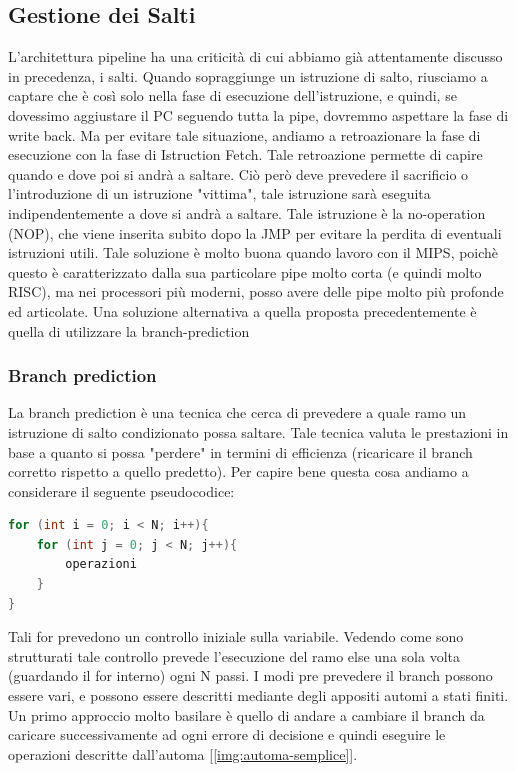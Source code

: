 \subsection{Gestione dei Salti}
L'architettura pipeline ha una criticità di cui abbiamo già attentamente discusso in precedenza, i salti.
Quando sopraggiunge un istruzione di salto, riusciamo a captare che è così solo nella fase di esecuzione dell'istruzione, e quindi, se dovessimo aggiustare il PC seguendo tutta la pipe, dovremmo aspettare la fase di write back. Ma per evitare tale situazione, andiamo a retroazionare la fase di esecuzione con la fase di Istruction Fetch. Tale retroazione permette di capire quando e dove poi si andrà a saltare. Ciò però deve prevedere il sacrificio o l'introduzione di un istruzione "vittima", tale istruzione sarà eseguita indipendentemente a dove si andrà a saltare. Tale istruzione è la no-operation (NOP), che viene inserita subito dopo la JMP per evitare la perdita di eventuali istruzioni utili.
Tale soluzione è molto buona quando lavoro con il MIPS, poichè questo è caratterizzato dalla sua particolare pipe molto corta (e quindi molto RISC), ma nei processori più moderni, posso avere delle pipe molto più profonde ed articolate. Una soluzione alternativa a quella proposta precedentemente è quella di utilizzare la branch-prediction

\subsubsection{Branch prediction}
La branch prediction è una tecnica che cerca di prevedere a quale ramo un istruzione di salto condizionato possa saltare. Tale tecnica valuta le prestazioni in base a quanto si possa "perdere" in termini di efficienza (ricaricare il branch corretto rispetto a quello predetto).
Per capire bene questa cosa andiamo a considerare il seguente pseudocodice:
\begin{lstlisting}[language=C]
for (int i = 0; i < N; i++){
    for (int j = 0; j < N; j++){
        operazioni
    }
}
\end{lstlisting}

Tali for prevedono un controllo iniziale sulla variabile. Vedendo come sono strutturati tale controllo prevede l'esecuzione del ramo else una sola volta (guardando il for interno) ogni N passi.
I modi pre prevedere il branch possono essere vari, e possono essere descritti mediante degli appositi automi a stati finiti. Un primo approccio molto basilare è quello di andare a cambiare il branch da caricare successivamente ad ogni errore di decisione e quindi eseguire le operazioni descritte dall'automa [\ref{img:automa-semplice}].

